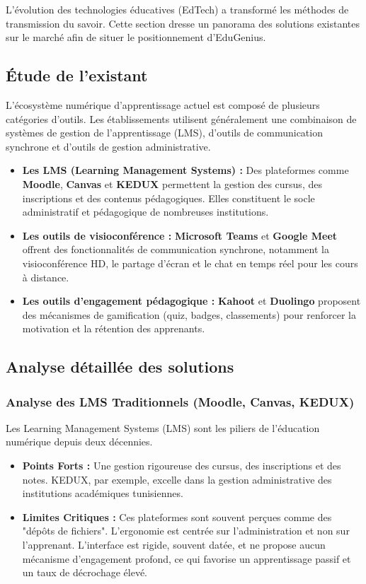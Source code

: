 L'évolution des technologies éducatives (EdTech) a transformé les méthodes de transmission du savoir. Cette section dresse un panorama des solutions existantes sur le marché afin de situer le positionnement d'EduGenius.

\subsection{Étude de l'existant}

L'écosystème numérique d'apprentissage actuel est composé de plusieurs catégories d'outils. Les établissements utilisent généralement une combinaison de systèmes de gestion de l'apprentissage (LMS), d'outils de communication synchrone et d'outils de gestion administrative.

\begin{itemize}
    \item \textbf{Les LMS (Learning Management Systems) :} Des plateformes comme \textbf{Moodle}, \textbf{Canvas} et \textbf{KEDUX} permettent la gestion des cursus, des inscriptions et des contenus pédagogiques. Elles constituent le socle administratif et pédagogique de nombreuses institutions.
    \item \textbf{Les outils de visioconférence :} \textbf{Microsoft Teams} et \textbf{Google Meet} offrent des fonctionnalités de communication synchrone, notamment la visioconférence HD, le partage d'écran et le chat en temps réel pour les cours à distance.
    \item \textbf{Les outils d'engagement pédagogique :} \textbf{Kahoot} et \textbf{Duolingo} proposent des mécanismes de gamification (quiz, badges, classements) pour renforcer la motivation et la rétention des apprenants.
\end{itemize}

\subsection{Analyse détaillée des solutions}

\subsubsection{Analyse des LMS Traditionnels (Moodle, Canvas, KEDUX)}
Les Learning Management Systems (LMS) sont les piliers de l'éducation numérique depuis deux décennies.
\begin{itemize}
\item \textbf{Points Forts :} Une gestion rigoureuse des cursus, des inscriptions et des notes. KEDUX, par exemple, excelle dans la gestion administrative des institutions académiques tunisiennes.
\item \textbf{Limites Critiques :} Ces plateformes sont souvent perçues comme des "dépôts de fichiers". L'ergonomie est centrée sur l'administration et non sur l'apprenant. L'interface est rigide, souvent datée, et ne propose aucun mécanisme d'engagement profond, ce qui favorise un apprentissage passif et un taux de décrochage élevé.
\end{itemize}

